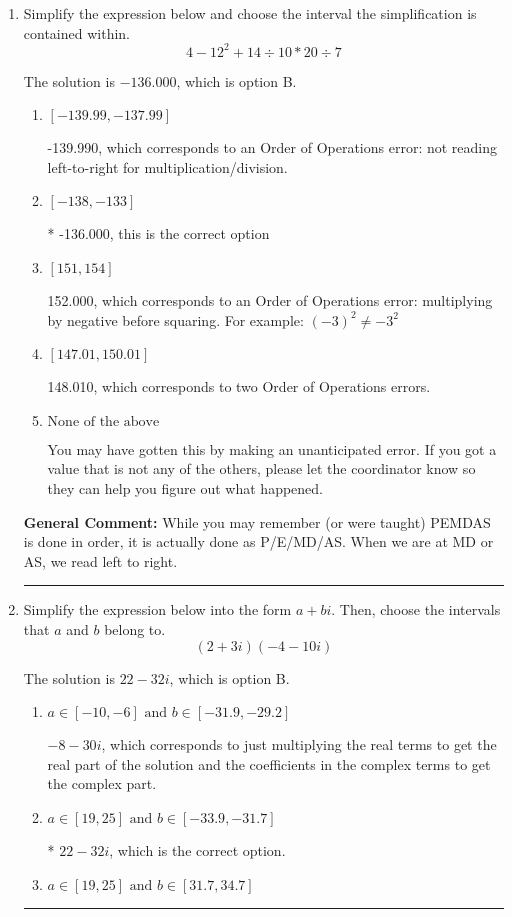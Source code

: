 \documentclass{extbook}[14pt]
\newcommand{\litem}[1]{\item #1

\rule{\textwidth}{0.4pt}}
\begin{document}
\begin{enumerate}\litem{
Simplify the expression below and choose the interval the simplification is contained within.
\[ 4 - 12^2 + 14 \div 10 * 20 \div 7 \]

The solution is \( -136.000 \), which is option B.\begin{enumerate}[label=\Alph*.]
\item \( [-139.99, -137.99] \)

 -139.990, which corresponds to an Order of Operations error: not reading left-to-right for multiplication/division.
\item \( [-138, -133] \)

* -136.000, this is the correct option
\item \( [151, 154] \)

 152.000, which corresponds to an Order of Operations error: multiplying by negative before squaring. For example: $(-3)^2 \neq -3^2$
\item \( [147.01, 150.01] \)

 148.010, which corresponds to two Order of Operations errors.
\item \( \text{None of the above} \)

 You may have gotten this by making an unanticipated error. If you got a value that is not any of the others, please let the coordinator know so they can help you figure out what happened.
\end{enumerate}

\textbf{General Comment:} While you may remember (or were taught) PEMDAS is done in order, it is actually done as P/E/MD/AS. When we are at MD or AS, we read left to right.
}
\litem{
Simplify the expression below into the form $a+bi$. Then, choose the intervals that $a$ and $b$ belong to.
\[ (2 + 3 i)(-4 - 10 i) \]

The solution is \( 22 - 32 i \), which is option B.\begin{enumerate}[label=\Alph*.]
\item \( a \in [-10, -6] \text{ and } b \in [-31.9, -29.2] \)

 $-8 - 30 i$, which corresponds to just multiplying the real terms to get the real part of the solution and the coefficients in the complex terms to get the complex part.
\item \( a \in [19, 25] \text{ and } b \in [-33.9, -31.7] \)

* $22 - 32 i$, which is the correct option.
\item \( a \in [19, 25] \text{ and } b \in [31.7, 34.7] \)


\end{enumerate}}
\end{enumerate}
\end{document}
